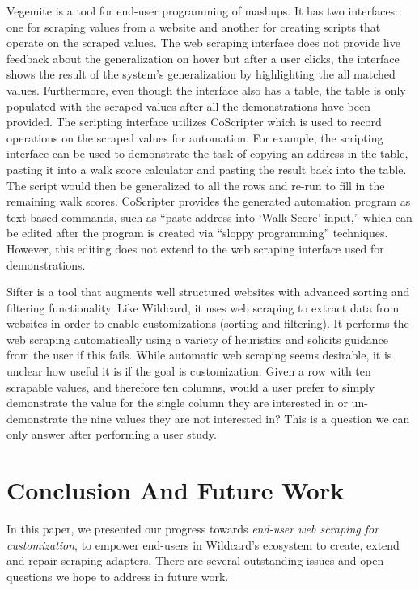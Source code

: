 \documentclass[sigconf,10pt]{acmart}
\begin{document}
Vegemite \citep{lin2009} is a tool for end-user programming of mashups.
It has two interfaces: one for scraping values from a website and
another for creating scripts that operate on the scraped values. The web
scraping interface does not provide live feedback about the
generalization on hover but after a user clicks, the interface shows the
result of the system's generalization by highlighting the all matched
values. Furthermore, even though the interface also has a table, the
table is only populated with the scraped values after all the
demonstrations have been provided. The scripting interface utilizes
CoScripter \citep{leshed2008} which is used to record operations on the
scraped values for automation. For example, the scripting interface can
be used to demonstrate the task of copying an address in the table,
pasting it into a walk score calculator and pasting the result back into
the table. The script would then be generalized to all the rows and
re-run to fill in the remaining walk scores. CoScripter provides the
generated automation program as text-based commands, such as ``paste
address into `Walk Score' input,'' which can be edited after the program
is created via ``sloppy programming'' \citep{lin2009} techniques.
However, this editing does not extend to the web scraping interface used
for demonstrations.

Sifter \citep{huynh2006} is a tool that augments well structured
websites with advanced sorting and filtering functionality. Like
Wildcard, it uses web scraping to extract data from websites in order to
enable customizations (sorting and filtering). It performs the web
scraping automatically using a variety of heuristics and solicits
guidance from the user if this fails. While automatic web scraping seems
desirable, it is unclear how useful it is if the goal is customization.
Given a row with ten scrapable values, and therefore ten columns, would
a user prefer to simply demonstrate the value for the single column they
are interested in or un-demonstrate the nine values they are not
interested in? This is a question we can only answer after performing a
user study.

\hypertarget{sec:conclusion}{%
\section{Conclusion And Future Work}\label{sec:conclusion}}

In this paper, we presented our progress towards \emph{end-user web
scraping for customization}, to empower end-users in Wildcard's
ecosystem to create, extend and repair scraping adapters. There are
several outstanding issues and open questions we hope to address in
future work.
\end{document}
